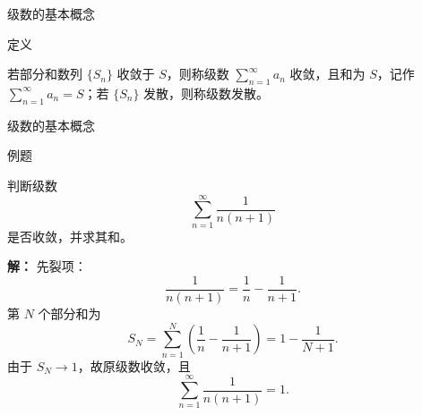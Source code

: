 \documentclass[aspectratio=169,10pt,fontset=fandol]{ctexbeamer}
\newenvironment{custom}[1]{\par\noindent\textbf{#1}\quad}{\par\vspace{0.8em}}
\begin{document}
\begin{frame}[t,fragile]{级数的基本概念}
\footnotesize
\begin{block}{定义}
{\footnotesize

若部分和数列 \(\{S_n\}\) 收敛于 \(S\)，则称级数 \(\sum\limits_{n = 1}^{  \infty } a_n\) 收敛，且和为 \(S\)，记作 \(\sum\limits_{n = 1}^{  \infty } a_n = S\)；若 \(\{S_n\}\) 发散，则称级数发散。

}
\end{block}
\end{frame}
\begin{frame}[t,fragile]{级数的基本概念}
\footnotesize
\begin{block}{例题}
{\footnotesize
判断级数
\[
\sum_{n=1}^{\infty}\frac{1}{n(n+1)}
\]
是否收敛，并求其和。

}
\end{block}
\pause
{\footnotesize
\textbf{解：}
先裂项：
\[
\frac{1}{n(n+1)}=\frac1n-\frac{1}{n+1}.
\]
第 $N$ 个部分和为
\[
S_N=\sum_{n=1}^{N}\left(\frac1n-\frac{1}{n+1}\right)
=1-\frac{1}{N+1}.
\]
由于 $S_N\to1$，故原级数收敛，且
\[
\sum_{n=1}^{\infty}\frac{1}{n(n+1)}=1.
\]

}
\end{frame}
\end{document}
